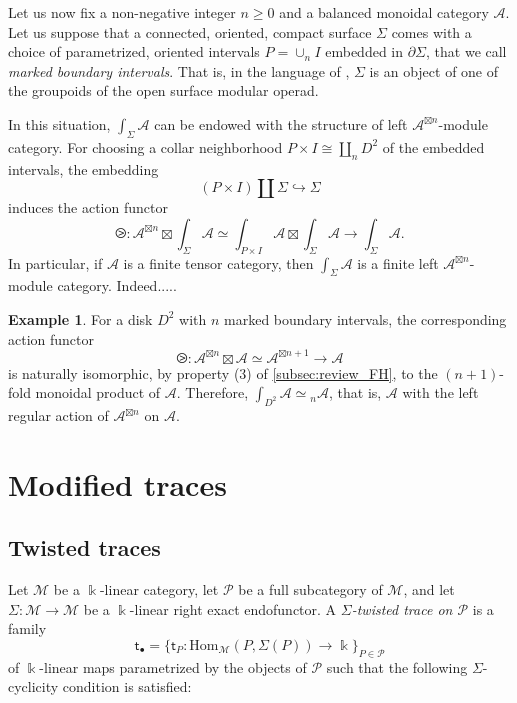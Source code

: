 \documentclass[11pt]{article}
\theoremstyle{definition}
\newtheorem{example}[theorem]{Example}
\begin{document}
Let us now fix a non-negative integer $n \geq 0$ and a balanced monoidal category $\mathcal{A}$.  Let us suppose that a connected, oriented, compact surface $\Sigma$ comes with a choice of parametrized, oriented intervals $P= \cup_n I $ embedded in $\partial \Sigma$, that we call \emph{marked boundary intervals}. That is, in the language of \cite{envas}, $\Sigma$ is an object of one of the groupoids of the open surface modular operad. 

In this situation, $\int_\Sigma \mathcal{A}$ can be endowed with the structure of left $\mathcal{A}^{\boxtimes n}$-module category. For choosing a collar neighborhood $P \times I \cong \amalg_n D^2$ of the embedded intervals, the embedding $$ (P \times I  ) \amalg \Sigma \hookrightarrow \Sigma  $$ induces the action functor $$ \ogreaterthan: \mathcal{A}^{\boxtimes n} \boxtimes  \int_\Sigma \mathcal{A} \simeq \int_{P \times I} \mathcal{A} \boxtimes \int_\Sigma \mathcal{A} \longrightarrow \int_\Sigma \mathcal{A}  .$$
In particular, if $\mathcal{A}$ is a finite tensor category, then $\int_\Sigma \mathcal{A}$ is a finite left $\mathcal{A}^{\boxtimes n}$-module category. Indeed..... 




\begin{example}\label{ex:disk_case}
For a disk $D^2$ with $n$ marked boundary intervals, the corresponding action functor 
$$ \ogreaterthan : \mathcal{A}^{\boxtimes n} \boxtimes \mathcal{A} \simeq \mathcal{A}^{\boxtimes n+1} \longrightarrow \mathcal{A}  $$
is naturally isomorphic, by property (3) of \cref{subsec:review_FH}, to the $(n+1)$-fold monoidal product of $\mathcal{A}$. Therefore, $\int_{D^2} \mathcal{A} \simeq {}_n \mathcal{A}$, that is, $\mathcal{A}$ with the left regular action of $\mathcal{A}^{\boxtimes n}$ on $\mathcal{A}$.
\end{example}



\section{Modified traces}


\subsection{Twisted traces}

Let $\mathcal{M}$ be a $\Bbbk$-linear category, let $\mathcal{P}$ be a full subcategory of $\mathcal{M}$,
and let $\Sigma : \mathcal{M} \to \mathcal{M}$ be a $\Bbbk$-linear right exact endofunctor. A
\emph{$\Sigma$-twisted trace on $\mathcal{P}$} is a family
\[
\mathsf{t}_\bullet = \{ \mathsf{t}_P : \mathrm{Hom}_{\mathcal{M}}(P, \Sigma(P)) \to \Bbbk \}_{P \in \mathcal{P}}
\]
of $\Bbbk$-linear maps parametrized by the objects of $\mathcal{P}$ such that the following $\Sigma$-cyclicity
condition is satisfied:
\end{document}
